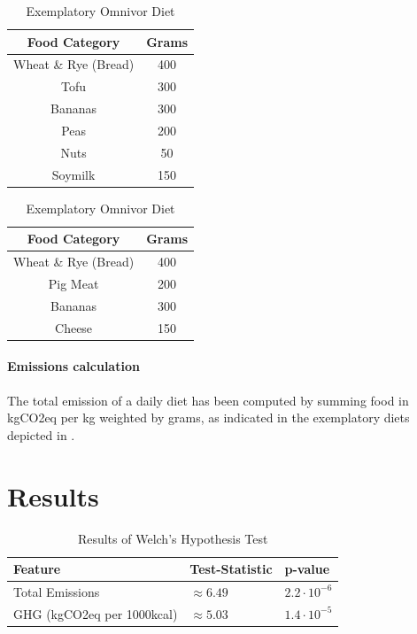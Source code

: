 \documentclass{article}
\begin{document}
\begin{table}
\parbox{.45\linewidth}{
  \caption{Exemplatory Plant-based  Diet}
\centering
\begin{tabular}{c c}
\toprule
Food Category & Grams\\
\midrule
Wheat \& Rye (Bread) & 400\\
Tofu & 300\\
Bananas & 300\\
Peas & 200\\
Nuts & 50\\
Soymilk & 150\\
\bottomrule
\end{tabular}
\label{tbl:plantdiet}
}
\hfill
\parbox{.45\linewidth}{
  \caption{Exemplatory Omnivor  Diet}
\centering
\begin{tabular}{c c}
\toprule
Food Category & Grams\\
\midrule
Wheat \& Rye (Bread) & 400\\
Pig Meat & 200\\
Bananas & 300\\
Cheese & 150\\
\bottomrule
\end{tabular}
\label{tbl:omnidiet}
}
\end{table}

\paragraph*{Emissions calculation} The total emission of a daily diet has been computed by  summing  food  in kgCO2eq per kg weighted by grams, as indicated in the exemplatory diets depicted in  .

\section{Results}
\begin{table}[h]
  \caption{Results of  Welch's Hypothesis Test}
  \label{tbl:results-test}
  \centering
  \begin{tabular}{lll}
    \toprule
    Feature     & Test-Statistic   & p-value  \\
    \midrule
    Total Emissions &$\approx 6.49$  & $ 2.2\cdot10^{-6}  $  \\
    GHG (kgCO2eq per 1000kcal)    & $\approx 5.03 $  & $ 1.4\cdot10^{-5}$    \\
    \bottomrule
  \end{tabular}
\end{table}
\end{document}
